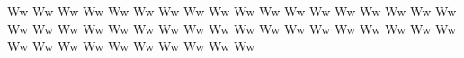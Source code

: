 \documentclass{worksheet}
\begin{document}
\begin{drillsheet}
\calligra
Ww Ww Ww Ww Ww Ww Ww Ww Ww Ww Ww Ww Ww Ww Ww Ww Ww Ww Ww Ww Ww Ww Ww Ww Ww Ww Ww Ww Ww Ww Ww Ww Ww Ww Ww Ww Ww Ww Ww Ww Ww Ww Ww Ww Ww Ww
\end{drillsheet}
\end{document}
